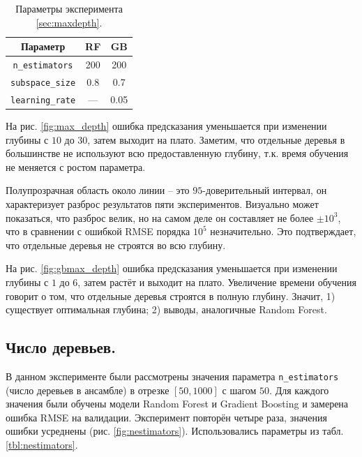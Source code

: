 \documentclass[12pt]{extarticle}
\begin{document}
\begin{table}
    \vspace{-5mm}
    \caption{Параметры эксперимента \ref{sec:maxdepth}.}
    \label{tbl:maxdepth}
    \begin{tabular}{c|c|c}
        Параметр & RF & GB \\
        \hline
        \texttt{n\_estimators} & 200 & 200 \\
        \texttt{subspace\_size} & 0.8 & 0.7 \\
        \texttt{learning\_rate} & --- & 0.05\\
    \end{tabular}
\end{table} 

На рис. \ref{fig:max_depth} ошибка предсказания уменьшается при изменении глубины с $10$ до $30$, затем выходит на плато. Заметим, что отдельные деревья в большинстве не используют всю предоставленную глубину, т.к. время обучения не меняется с ростом параметра.

Полупрозрачная область около линии -- это $95$-доверительный интервал, он характеризует разброс результатов пяти экспериментов. Визуально может показаться, что разброс велик, но на самом деле он составляет не более $\pm10^3$, что в сравнении с ошибкой RMSE порядка $10^5$ незначительно. Это подтверждает, что отдельные деревья не строятся во всю глубину.

На рис. \ref{fig:gbmax_depth} ошибка предсказания уменьшается при изменении глубины с $1$ до $6$, затем растёт и выходит на плато. Увеличение времени обучения говорит о том, что отдельные деревья строятся в полную глубину. Значит, 1) существует оптимальная глубина; 2) выводы, аналогичные Random Forest.

\subsection{Число деревьев.} \label{sec:nestimators}

В данном эксперименте были рассмотрены значения параметра \texttt{n\_estimators} (число деревьев в ансамбле) в отрезке $[50, 1000]$ с шагом $50$. Для каждого значения были обучены модели Random Forest и Gradient Boosting и замерена ошибка RMSE на валидации. Эксперимент повторён четыре раза, значения ошибки усреднены (рис. \ref{fig:nestimators}). Использовались параметры из табл. \ref{tbl:nestimators}.
\end{document}
